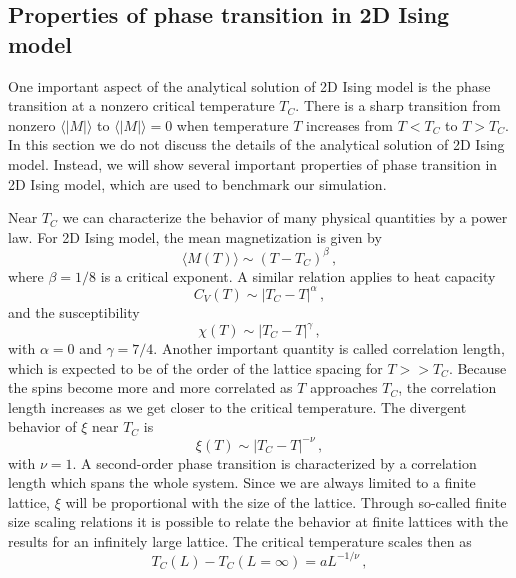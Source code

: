 \subsection{Properties of phase transition in 2D Ising model}\label{sec:transition}
One important aspect of the analytical solution of 2D Ising model is the phase transition at a nonzero critical temperature $T_C$. 
There is a sharp transition from nonzero $\langle|M|\rangle $ to $\langle|M|\rangle=0$ 
when temperature $T$ increases from $T<T_C$ to $T>T_C$. 
In this section we do not discuss the details of the analytical solution of 2D Ising model. 
Instead, we will show several important properties of phase transition in 2D Ising model, 
which are used to benchmark our simulation. 
\par
Near $T_C$ we can characterize the behavior of many physical quantities by a power law.
For 2D Ising model, the mean magnetization is given by
\begin{equation}
\langle M(T) \rangle \sim \left(T-T_C\right)^{\beta}\,,
\end{equation}
where $\beta=1/8$ is a critical exponent. A similar relation applies to heat capacity 
\begin{equation}
C_V(T) \sim \left|T_C-T\right|^{\alpha}\,,
\end{equation}
and the susceptibility
\begin{equation}
\chi(T) \sim \left|T_C-T\right|^{\gamma}\,,
\end{equation}
with $\alpha = 0$ and $\gamma = 7/4$.
Another important quantity is called correlation length, which is expected
to be of the order of the lattice spacing for $T>> T_C$. Because the spins
become more and more correlated as $T$ approaches $T_C$, the correlation
length increases as we get closer to the critical temperature. The divergent
behavior of $\xi$ near $T_C$ is 
\begin{equation}
\xi(T) \sim \left|T_C-T\right|^{-\nu}\,,
\label{eq:xi}
\end{equation}
with $\nu=1$. 
A second-order phase transition is characterized by a
correlation length which spans the whole system.
Since we are always limited to a finite lattice, $\xi$ will
be proportional with the size of the lattice. 
Through so-called finite size scaling relations
it is possible to relate the behavior at finite lattices with the 
results for an infinitely large lattice.
The critical temperature scales then as
\begin{equation}
T_C(L)-T_C(L=\infty) = aL^{-1/\nu}\,,
\label{eq:tc}
\end{equation}

